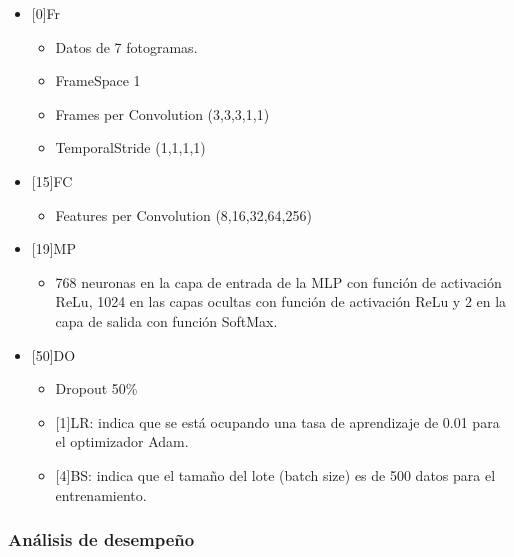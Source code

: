\begin{onehalfspacing}
\begin{itemize}
    \item {[0]Fr}
        \begin{itemize}
            \item Datos de 7 fotogramas.
            \item FrameSpace 1
            \item Frames per Convolution (3,3,3,1,1)
            \item TemporalStride (1,1,1,1)
    \end{itemize}
    
    \item {[15]FC}
        \begin{itemize}
            \item Features per Convolution (8,16,32,64,256)
    \end{itemize}
    
    \item {[19]MP}
        \begin{itemize}
            \item 768 neuronas en la capa de entrada de la MLP con función de activación ReLu, 1024 en las capas ocultas con función de activación ReLu y 2 en la capa de salida con función SoftMax.
    \end{itemize}
    
    \item {[50]DO}
        \begin{itemize}
            \item Dropout 50\%
            
    \item {[1]LR}: indica que se está ocupando una tasa de aprendizaje de 0.01 para el optimizador Adam.
    
     \item {[4]BS}: indica que el tamaño del lote (batch size) es de 500 datos para el entrenamiento.
    \end{itemize}

\end{itemize}




\subsubsection{Análisis de desempeño}
\label{sec:TDesempenoModeloPiloto}


\end{onehalfspacing}
